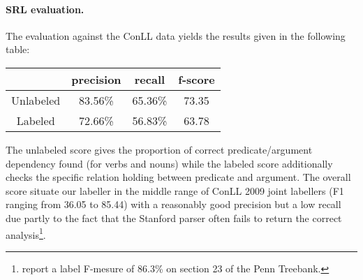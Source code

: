 \documentclass[twocolumn,10pt]{article}
\renewcommand\cite{\citep}
\begin{document}
\paragraph{SRL evaluation.}
The evaluation against the ConLL data yields the results given in
the following table:
\begin{center}
\begin{tabular}{|c||c|c|c|}\hline
          & precision & recall  & f-score \\\hline\hline
Unlabeled &   83.56\% & 65.36\% & 73.35   \\\hline
Labeled   &   72.66\% & 56.83\% & 63.78   \\\hline
\end{tabular}
\end{center}
The unlabeled score gives the proportion of correct predicate/argument
dependency found (for verbs and nouns) while the labeled score
additionally checks the specific relation holding between predicate
and argument. The overall score situate our labeller in the middle
range of ConLL 2009 joint labellers (F1 ranging from 36.05 to 85.44)
with a reasonably good precision but a low recall due partly to the
fact that the Stanford parser often fails to return the correct
analysis\footnote{\cite{klein03accurate} report a label F-mesure of
  86.3\% on section 23 of the Penn Treebank.}.
\end{document}
